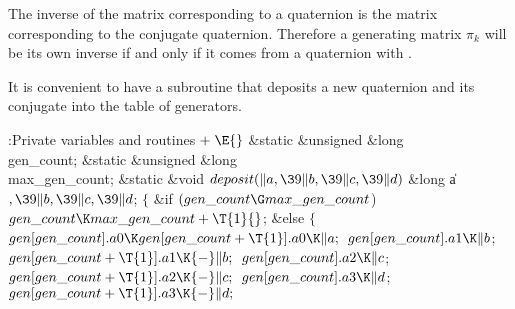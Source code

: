 The inverse of the matrix corresponding to a quaternion is the matrix
corresponding to the conjugate quaternion. Therefore a generating
matrix $\pi_k$ will be its own inverse if and only if it comes from
a quaternion with .

It is convenient to have a subroutine that deposits a new quaternion
and its conjugate into the table of generators.

\Y\B\4:Private variables and routines\X${}\mathrel+\E{}$\6
\&{static} \&{unsigned} \&{long} \\{gen\_count};\6
\&{static} \&{unsigned} \&{long} \\{max\_gen\_count};\7
\1\1\&{static} \&{void} ${}\\{deposit}(\|a,\39\|b,\39\|c,\39\|d){}$\6
\&{long} \|a${},\39\|b,\39\|c,\39\|d{}$;%
\2\2\6
${}\{{}$\1\6
\&{if} ${}(\\{gen\_count}\G\\{max\_gen\_count}{}$)\1\6
${}\\{gen\_count}\K\\{max\_gen\_count}+\T{1}{}$;\2\6
\&{else}\5
${}\{{}$\1\6
${}\\{gen}[\\{gen\_count}].\\{a0}\K\\{gen}[\\{gen\_count}+\T{1}].\\{a0}\K%
\|a;{}$\6
${}\\{gen}[\\{gen\_count}].\\{a1}\K\|b{}$;\5
${}\\{gen}[\\{gen\_count}+\T{1}].\\{a1}\K{-}\|b;{}$\6
${}\\{gen}[\\{gen\_count}].\\{a2}\K\|c{}$;\5
${}\\{gen}[\\{gen\_count}+\T{1}].\\{a2}\K{-}\|c;{}$\6
${}\\{gen}[\\{gen\_count}].\\{a3}\K\|d{}$;\5
${}\\{gen}[\\{gen\_count}+\T{1}].\\{a3}\K{-}\|d;{}$\6
